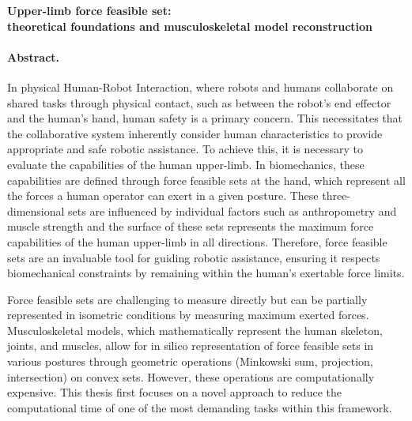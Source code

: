\begin{center}
    \textbf{Upper-limb force feasible set:}\\ 
    \textbf{theoretical foundations and musculoskeletal model reconstruction}
\end{center}
\paragraph*{Abstract.} 

In physical Human-Robot Interaction, where robots and humans collaborate on shared tasks through physical contact, such as between the robot's end effector and the human's hand, human safety is a primary concern. This necessitates that the collaborative system inherently consider human characteristics to provide appropriate and safe robotic assistance. To achieve this, it is necessary to evaluate the capabilities of the human upper-limb. In biomechanics, these capabilities are defined through force feasible sets at the hand, which represent all the forces a human operator can exert in a given posture. These three-dimensional sets are influenced by individual factors such as anthropometry and muscle strength and the surface of these sets represents the maximum force capabilities of the human upper-limb in all directions. Therefore, force feasible sets are an invaluable tool for guiding robotic assistance, ensuring it respects biomechanical constraints by remaining within the human's exertable force limits.

Force feasible sets are challenging to measure directly but can be partially represented in isometric conditions by measuring maximum exerted forces. Musculoskeletal models, which mathematically represent the human skeleton, joints, and muscles, allow for in silico representation of force feasible sets in various postures through geometric operations (Minkowski sum, projection, intersection) on convex sets. However, these operations are computationally expensive. This thesis first focuses on a novel approach to reduce the computational time of one of the most demanding tasks within this framework.

